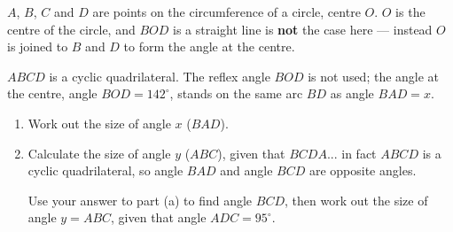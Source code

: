 \begin{question}
\noindent $A$, $B$, $C$ and $D$ are points on the circumference of a circle, centre $O$.
$O$ is the centre of the circle, and $BOD$ is a straight line is \textbf{not} the case here — instead $O$ is joined to $B$ and $D$ to form the angle at the centre.

\begin{center}
\end{center}

\noindent $ABCD$ is a cyclic quadrilateral. The reflex angle $BOD$ is not used; the angle at the centre, angle $BOD = 142^\circ$, stands on the same arc $BD$ as angle $BAD = x$.

\begin{enumerate}
    \item[(a)] Work out the size of angle $x$ ($BAD$).
    \vspace{3.5cm}

    \item[(b)] Calculate the size of angle $y$ ($ABC$), given that $BCDA$... in fact $ABCD$ is a cyclic quadrilateral, so angle $BAD$ and angle $BCD$ are opposite angles.

    Use your answer to part (a) to find angle $BCD$, then work out the size of angle $y = ABC$, given that angle $ADC = 95^\circ$.
    \vspace{3.5cm}
\end{enumerate}
\end{question}
